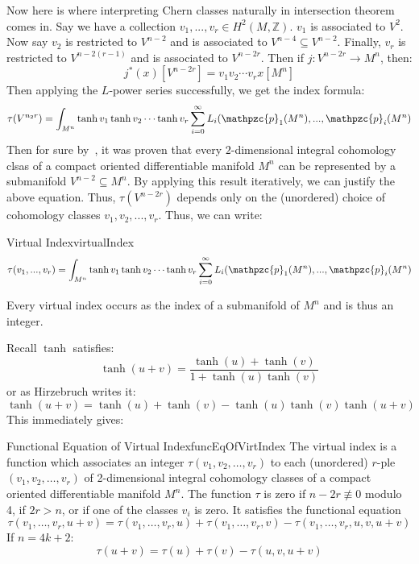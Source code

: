 \documentclass{book}
\newcommand{\Z}{{\mathbb{Z}}}
\newcommand{\cp}{{\mathpzc{p}}}
\newcommand{\sse}{\subseteq}
\begin{document}
Now here is where interpreting Chern classes naturally in intersection theorem comes in. Say we have
a collection $v_1, ..., v_r \in H^2(M, \Z)$. $v_1$ is associated to $V^2$. Now say $v_2$ is restricted to $V^{n-2}$ and
is associated to $V^{n-4} \sse V^{n-2}$. Finally, $v_r$ is restricted to $V^{n-2(r-1)}$ and is associated to
$V^{n-2r}$. Then if $j: V^{n-2r} \to M^n$, then:
\[
  j^*(x)[V^{n-2r}] = v_1v_2\cdots v_rx[M^n]
\]
Then applying the $L$-power series successfully, we get the index formula:
\[
  \tau(V^{n_2r}) = \int_{M^n} \tanh v_1\tanh v_2 \cdots \tanh v_r \sum_{i=0}^\infty L_i(\cp_1(M^n), ...,
  \cp_i(M^n)
\]
Then for sure by~\cite{NateKTheory}, it was proven that every $2$-dimensional integral cohomology clsas of
a compact oriented differentiable manifold $M^n$ can be represented by a submanifold $V^{n-2} \sse M^n$. By
applying this result iteratively, we can justify the above equation. Thus, $\tau(V^{n-2r})$ depends only on
the (unordered) choice of cohomology classes $v_1,v_2, ..., v_r$. Thus, we can write:
\begin{defn}{Virtual Index}{virtualIndex}
\[
  \tau(v_1, ..., v_r) = \int_{M^n} \tanh v_1\tanh v_2 \cdots \tanh v_r \sum_{i=0}^\infty L_i(\cp_1(M^n), ...,
  \cp_i(M^n)
\]
\end{defn}

Every virtual index occurs as the index of a submanifold of $M^n$ and is thus an integer.

Recall $\tanh$ satisfies:
\[
  \tanh(u+v) = \frac{\tanh(u) + \tanh(v)}{1  +\tanh(u)\tanh(v)}
\]
or as Hirzebruch writes it:
\[
  \tanh(u+v) = \tanh(u) + \tanh(v) - \tanh(u)\tanh(v)\tanh(u+v)
\]
This immediately gives:

\begin{thm}{Functional Equation of Virtual Index}{funcEqOfVirtIndex}
The virtual index is a function which associates an integer $\tau(v_1, v_2, \ldots, v_r)$ to each (unordered)
$r$-ple $(v_1, v_2, \ldots, v_r)$ of 2-dimensional integral cohomology classes of a compact oriented
differentiable manifold $M^n$. The function $\tau$ is zero if $n-2r \not\equiv 0$ modulo 4, if $2r > n$, or if
one of the classes $v_i$ is zero. It satisfies the functional equation
\[
    \tau(v_1,\ldots,v_r,u+v) = \tau(v_1,\ldots,v_r,u) + \tau(v_1,\ldots,v_r,v) - \tau(v_1,\ldots,v_r,u,v,u+v)
\]
If $n = 4k+2$:
\[
  \tau(u+v) = \tau(u) + \tau(v) - \tau(u,v,u+v)
\]
\end{thm}

\end{document}
